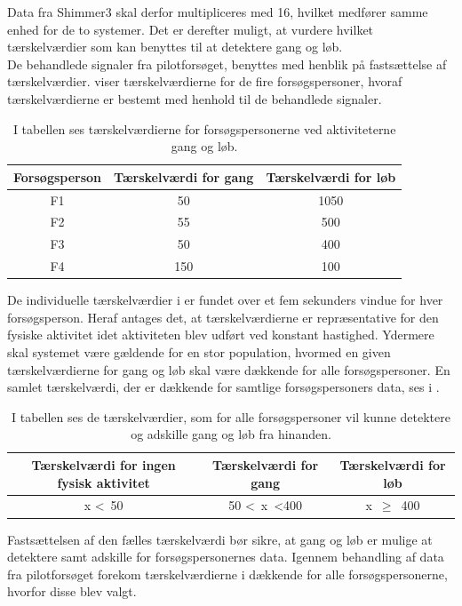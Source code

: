 Data fra Shimmer3 skal derfor multipliceres med 16, hvilket medfører samme enhed for de to systemer. Det er derefter muligt, at vurdere hvilket tærskelværdier som kan benyttes til at detektere gang og løb.\\
De behandlede signaler fra pilotforsøget, benyttes med henblik på fastsættelse af tærskelværdier.  viser tærskelværdierne for de fire forsøgspersoner, hvoraf tærskelværdierne er bestemt med henhold til de behandlede signaler. 
\begin{table}[H]
	\centering
	\begin{tabular}{ccc}
		\hline
		\rowcolor[HTML]{C0C0C0} 
		Forsøgsperson & Tærskelværdi for gang & Tærskelværdi for løb \\ \hline
		\rowcolor[HTML]{FFFFFF} 
		F1 & 50 & 1050 \\ \hline
		\rowcolor[HTML]{FFFFFF} 
		F2 & 55 & 500 \\ \hline
		\rowcolor[HTML]{FFFFFF} 
		F3 & 50 & 400 \\ \hline
		\rowcolor[HTML]{FFFFFF} 
		F4 & 150 & 100 \\ \hline
	\end{tabular}
	\caption{I tabellen ses tærskelværdierne for forsøgspersonerne ved aktiviteterne gang og løb.}
	\label{tab:individuel_taerskel}
\end{table}\vspace{-0.5cm}
De individuelle tærskelværdier i  er fundet over et fem sekunders vindue for hver forsøgsperson. Heraf antages det, at tærskelværdierne er repræsentative for den fysiske aktivitet idet aktiviteten blev udført ved konstant hastighed. Ydermere skal systemet være gældende for en stor population, hvormed en given tærskelværdierne for gang og løb skal være dækkende for alle forsøgspersoner. En samlet tærskelværdi, der er dækkende for samtlige forsøgspersoners data, ses i .
\begin{table}[H]
	\centering
	\begin{tabular}{ccc}
		\hline
		\rowcolor[HTML]{C0C0C0} 
		Tærskelværdi for ingen fysisk aktivitet & Tærskelværdi for gang & Tærskelværdi for løb \\ \hline
		x \textless~50 & 50 \textless~x~\textless 400 & x~$\geq$~400 \\ \hline
	\end{tabular}
	\caption{I tabellen ses de tærskelværdier, som for alle forsøgspersoner vil kunne detektere og adskille gang og løb fra hinanden.}
	\label{tab:faelles_taerskel}
\end{table}\vspace{-0.5cm}
Fastsættelsen af den fælles tærskelværdi bør sikre, at gang og løb er mulige at detektere samt adskille for forsøgspersonernes data. Igennem behandling af data fra pilotforsøget forekom tærskelværdierne i  dækkende for alle forsøgspersonerne, hvorfor disse blev valgt.

